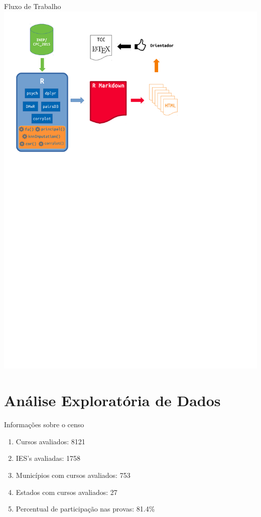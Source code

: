 \documentclass{beamer}
\begin{document}
\begin{frame}{Fluxo de Trabalho}
	\includegraphics[width=1.1\textwidth]{images/work-flow}
\end{frame}

\section{Análise Exploratória de Dados}
	\begin{frame}{Informações sobre o censo}
		\begin{enumerate}
			\item Cursos avaliados:  8121
			\item IES's avaliadas:  1758
			\item Municípios com cursos avaliados:  753
			\item Estados com cursos avaliados:  27
			\item Percentual de participação nas provas:  81.4\%
		\end{enumerate}
	\end{frame}
\end{document}
